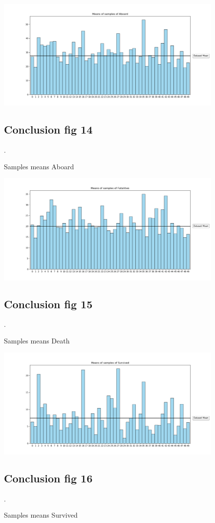\documentclass{article}
\begin{document}
\begin{figure}[!hbt]
\includegraphics[width=1.3\linewidth,height=0.500\textheight]{Samples_Aboard.png}
\caption{Samples means Aboard }
\label{fig14:}
\subsection{Conclusion fig 14}
.
\end{figure}

\begin{figure}[!hbt]
\includegraphics[width=1.3\linewidth,height=0.500\textheight]{Samples_Death.png}
\caption{Samples means Death }
\label{fig15:}
\subsection{Conclusion fig 15}
.
\end{figure}

\begin{figure}[!hbt]
\includegraphics[width=1.3\linewidth,height=0.500\textheight]{Samples_Survived.png}
\caption{Samples means Survived  }
\label{fig16:}
\subsection{Conclusion fig 16}
.
\end{figure}
\end{document}
